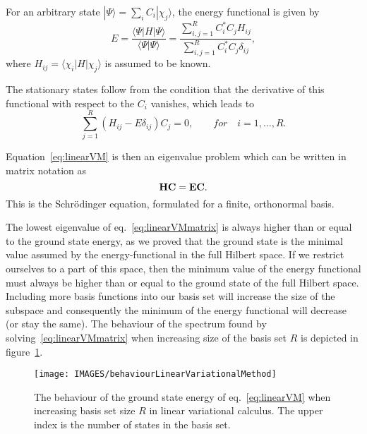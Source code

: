 For an arbitrary state $|\Psi \rangle = \sum_i C_i | \chi_j \rangle$, the energy functional is given by
\begin{equation*}
E=\frac{\langle \Psi |H | \Psi \rangle}{\langle \Psi| \Psi \rangle}=\frac{\sum_{i,j=1}^R C_i^* C_j H_{ij} }{ \sum_{i,j=1}^R C_i^* C_j \delta_{ij}},
\end{equation*}
where $H_{ij}=\langle \chi_i | H | \chi_j \rangle$ is assumed to be known.

The stationary states follow from the condition that the derivative of this functional with respect to the $C_i$ vanishes, which leads to
\begin{equation}
\label{eq:linearVM}
\sum_{j=1}^R (H_{ij}- E \delta_{ij}) C_j = 0, \qquad for \quad i=1,\dots, R.
\end{equation}

Equation~\ref{eq:linearVM} is then an eigenvalue problem which can be written in matrix notation as
\begin{equation}
\label{eq:linearVMmatrix}
\bf{H} \bf{C} = E \bf{C}.
\end{equation}
This is the Schr\"odinger equation, formulated for a finite, orthonormal basis.

The lowest eigenvalue of eq.~\ref{eq:linearVMmatrix} is always higher than or equal to the ground state energy, as we proved that the ground state is the minimal value assumed by the energy-functional in the full Hilbert space.
If we restrict ourselves to a part of this space, then the minimum value of the energy functional must always be higher than or equal to the ground state of the full Hilbert space.
Including more basis functions into our basis set will increase the size of the subspace and consequently the minimum of the energy functional will decrease (or stay the same).
The behaviour of the spectrum found by solving~\ref{eq:linearVMmatrix} when increasing size of the basis set $R$ is depicted in figure~\ref{fig:behaviourVM}.


\begin{figure}[htp]
 \centering
 \texttt{[image: IMAGES/behaviourLinearVariationalMethod]}
 \caption{The behaviour of the ground state energy of eq.~\ref{eq:linearVM} when increasing basis set size $R$ in linear variational calculus. The upper index is the number of states in the basis set.}
 \label{fig:behaviourVM}
\end{figure}


